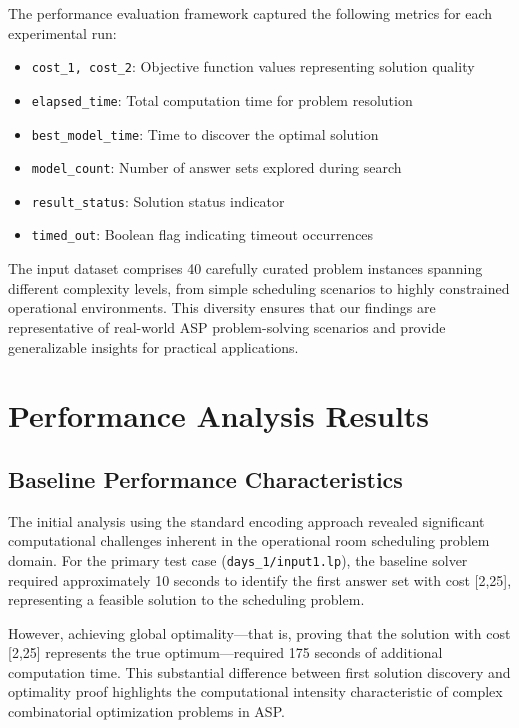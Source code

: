 \documentclass[11pt,a4paper]{article}
\begin{document}
The performance evaluation framework captured the following metrics for each experimental run:
\begin{itemize}
\item \texttt{cost\_1, cost\_2}: Objective function values representing solution quality
\item \texttt{elapsed\_time}: Total computation time for problem resolution
\item \texttt{best\_model\_time}: Time to discover the optimal solution
\item \texttt{model\_count}: Number of answer sets explored during search
\item \texttt{result\_status}: Solution status indicator
\item \texttt{timed\_out}: Boolean flag indicating timeout occurrences
\end{itemize}

The input dataset comprises 40 carefully curated problem instances spanning different complexity levels, from simple scheduling scenarios to highly constrained operational environments. This diversity ensures that our findings are representative of real-world ASP problem-solving scenarios and provide generalizable insights for practical applications.

\section{Performance Analysis Results}

\subsection{Baseline Performance Characteristics}

The initial analysis using the standard encoding approach revealed significant computational challenges inherent in the operational room scheduling problem domain. For the primary test case (\texttt{days\_1/input1.lp}), the baseline solver required approximately 10 seconds to identify the first answer set with cost [2,25], representing a feasible solution to the scheduling problem.

However, achieving global optimality—that is, proving that the solution with cost [2,25] represents the true optimum—required 175 seconds of additional computation time. This substantial difference between first solution discovery and optimality proof highlights the computational intensity characteristic of complex combinatorial optimization problems in ASP.
\end{document}
